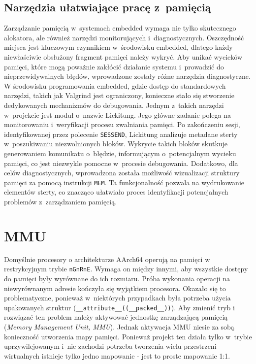 \documentclass[shortabstract]{iithesis}
\begin{document}
\subsection{Narzędzia ułatwiające pracę z~pamięcią}
Zarządzanie pamięcią w~systemach embedded wymaga nie tylko skutecznego alokatora, ale również narzędzi monitorujących i~diagnostycznych. Oszczędność miejsca jest kluczowym czynnikiem w~środowisku embedded, dlatego każdy niewłaściwie obsłużony fragment pamięci należy wykryć. Aby unikać wycieków pamięci, które mogą poważnie zakłócić działanie systemu i~prowadzić do nieprzewidywalnych błędów, wprowadzone zostały różne narzędzia diagnostyczne.
W środowisku programowania embedded, gdzie dostęp do standardowych narzędzi, takich jak Valgrind jest ograniczony, konieczne stało się stworzenie dedykowanych mechanizmów do debugowania. Jednym z~takich narzędzi w~projekcie jest moduł o~nazwie Lickitung. Jego główne zadanie polega na monitorowaniu i~weryfikacji procesu zwalniania pamięci. Po zakończeniu sesji, identyfikowanej przez polecenie \texttt{SESSEND}, Lickitung analizuje metadane sterty w~poszukiwaniu niezwolnionych bloków. Wykrycie takich bloków skutkuje generowaniem komunikatu o~błędzie, informującym o~potencjalnym wycieku pamięci, co jest niezwykle pomocne w~procesie debugowania.
Dodatkowo, dla celów diagnostycznych, wprowadzona została możliwość wizualizacji struktury pamięci za pomocą instrukcji \texttt{MEM}. Ta funkcjonalność pozwala na wydrukowanie elementów sterty, co znacząco ułatwiało proces identyfikacji potencjalnych problemów z~zarządzaniem pamięcią.

\section{MMU}
Domyślnie procesory o architekturze AArch64 operują na pamięci w restrykcyjnym trybie \texttt{nGnRnE}. Wymaga on między innymi, aby wszystkie dostępy do pamięci były wyrównane do ich rozmiaru. Próba wykonania operacji na niewyrównanym adresie kończyła się wyjątkiem procesora. Okazało się to problematyczne, ponieważ w~niektórych przypadkach była potrzeba użycia upakowanych struktur (\texttt{\_\_attribute\_\_((\_\_packed\_\_))}). Aby zmienić tryb i rozwiązać ten problem należy aktywować jednostkę zarządzającą pamięcią (\textit{Memory Management Unit, MMU}). Jednak aktywacja MMU niesie za sobą konieczność utworzenia mapy pamięci. Ponieważ projekt ten działa tylko w~trybie uprzywilejowanym i~nie zachodzi potrzeba tworzenia wielu przestrzeni wirtualnych istnieje tylko jedno mapowanie - jest to proste mapowanie 1:1.
\end{document}
